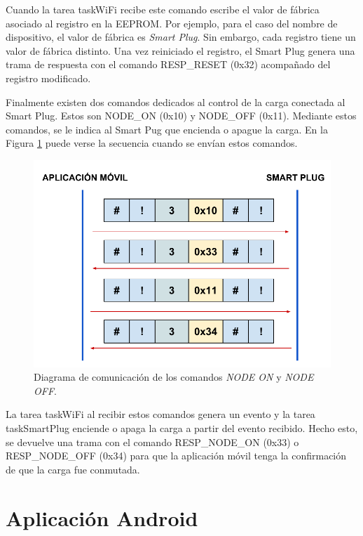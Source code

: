 Cuando la tarea taskWiFi recibe este comando escribe el valor de fábrica asociado al registro en la EEPROM. Por ejemplo, para el caso del nombre de dispositivo, el valor de fábrica es \textit{Smart Plug}. Sin embargo, cada registro tiene un valor de fábrica distinto. Una vez reiniciado el registro, el Smart Plug genera una trama de respuesta con el comando RESP\_RESET (0x32) acompañado del registro modificado.

Finalmente existen dos comandos dedicados al control de la carga conectada al Smart Plug. Estos son NODE\_ON (0x10) y NODE\_OFF (0x11). Mediante estos comandos, se le indica al Smart Pug que encienda o apague la carga. En la Figura \ref{fig:comunicacion_node} puede verse la secuencia cuando se envían estos comandos.

\begin{figure}[h]
	\centering
	\includegraphics[width=14cm]{./Figures/3_2_5_comunicacion_NODE.pdf}
	\caption{Diagrama de comunicación de los comandos \textit{NODE ON} y \textit{NODE OFF}.}
	\label{fig:comunicacion_node}
\end{figure}

La tarea taskWiFi al recibir estos comandos genera un evento y la tarea taskSmartPlug enciende o apaga la carga a partir del evento recibido. Hecho esto, se devuelve una trama con el comando RESP\_NODE\_ON (0x33) o RESP\_NODE\_OFF (0x34) para que la aplicación móvil tenga la confirmación de que la carga fue conmutada.


\section{Aplicación Android}
\label{section:app}

